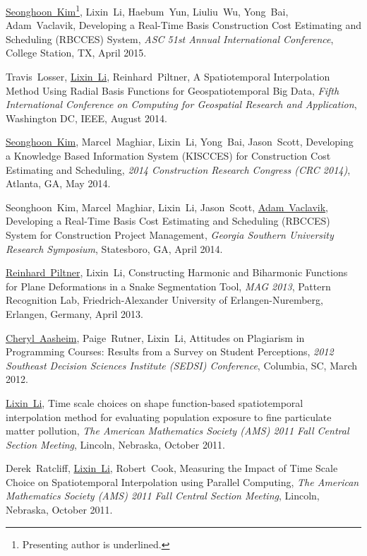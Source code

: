 \documentclass[10pt]{article}
\def\u{\underline}
\begin{document}
\begin{bibenum}

\item \u{Seonghoon~Kim}\footnote{Presenting author is underlined.}, Lixin~Li, Haebum~Yun, Liuliu~Wu, Yong~Bai, Adam~Vaclavik, Developing a Real-Time Basis Construction Cost Estimating and Scheduling (RBCCES) System, {\it ASC 51st Annual International Conference}, College Station, TX, April 2015.

\item Travis~Losser, \u{Lixin~Li}, Reinhard~Piltner, A Spatiotemporal Interpolation Method Using Radial Basis Functions for Geospatiotemporal Big Data, {\it Fifth International Conference on Computing for Geospatial Research and Application},  Washington DC, IEEE, August 2014.

\item \u{Seonghoon~Kim}, Marcel~Maghiar, Lixin~Li, Yong~Bai, Jason~Scott,
Developing a Knowledge Based Information System (KISCCES) for 
Construction Cost Estimating and Scheduling, {\it 2014 Construction Research Congress (CRC 2014)}, 
Atlanta, GA, May 2014.

\item Seonghoon~Kim, Marcel~Maghiar, Lixin~Li, Jason~Scott, \u{Adam~Vaclavik}, Developing a Real-Time Basis Cost Estimating and Scheduling (RBCCES) System for Construction Project Management, {\it Georgia Southern University Research Symposium}, Statesboro, GA, April 2014.

\item \u{Reinhard~Piltner}, Lixin~Li, 
Constructing Harmonic and Biharmonic Functions for Plane Deformations in a Snake Segmentation Tool,
{\it MAG 2013}, Pattern Recognition Lab, Friedrich-Alexander University of Erlangen-Nuremberg, Erlangen, Germany,
April 2013.

\item \u{Cheryl~Aasheim}, Paige~Rutner, Lixin~Li, Attitudes on Plagiarism in 
Programming Courses: Results from a Survey on Student Perceptions, 
{\it 2012 Southeast Decision Sciences Institute (SEDSI) Conference}, 
Columbia, SC, March 2012.

\item \u{Lixin~Li}, Time scale choices on shape function-based spatiotemporal 
interpolation method for evaluating population exposure to fine particulate matter pollution, 
{\it The American Mathematics Society (AMS) 2011 Fall Central Section Meeting},
Lincoln, Nebraska, October 2011.

\item Derek~Ratcliff, \u{Lixin~Li}, Robert~Cook, 
Measuring the Impact of Time Scale Choice on Spatiotemporal Interpolation using Parallel Computing,
{\it The American Mathematics Society (AMS) 2011 Fall Central Section Meeting},
Lincoln, Nebraska, October 2011.


\end{bibenum}
\end{document}
